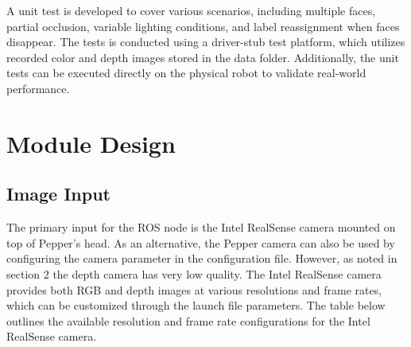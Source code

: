 \documentclass{CSSRforAfrica}
\begin{document}
A unit test is developed to cover various scenarios, including multiple faces, partial occlusion, variable lighting conditions, and label reassignment when faces disappear. The tests is conducted using a driver-stub test platform, which utilizes recorded color and depth images stored in the data folder. Additionally, the unit tests can be executed directly on the physical robot to validate real-world performance.

\newpage
\section{Module Design}
\subsection*{Image Input}
The primary input for the ROS node is the Intel RealSense camera mounted on top of Pepper's head. As an alternative, the Pepper camera can also be used by configuring the camera parameter in the configuration file. However, as noted in section 2 the depth camera has very low quality. The Intel RealSense camera provides both RGB and depth images at various resolutions and frame rates, which can be customized through the launch file parameters. The table below outlines the available resolution and frame rate configurations for the Intel RealSense camera.
\end{document}
